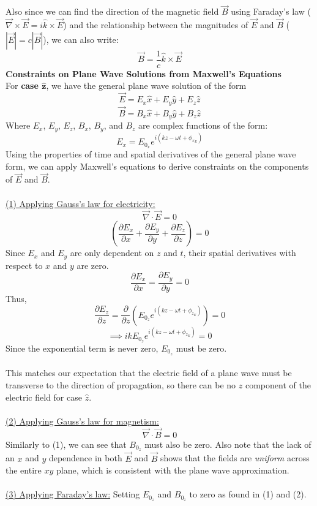 \documentclass[12pt]{article}
\begin{document}
Also since we can find the direction of the magnetic field $\vec{B}$ using Faraday's law ($\vec{\nabla}\times\vec{E} = i\hat{k}\times\vec{E} $) and the relationship between the magnitudes of $\vec{E}$ and $\vec{B}$ ($|\vec{E}| = c|\vec{B}|$), we can also write:
\[\boxed{\vec{B}=\frac{1}{c}\hat{k}\times\vec{E}}\]
\newpage\noindent
\textbf{Constraints on Plane Wave Solutions from Maxwell's Equations}\\
For \textbf{case $\mathbf{\hat{z}}$}, we have the general plane wave solution of the form
\[\vec{E} = E_x \hat{x} + E_y \hat{y} + E_z \hat{z}\]
\[\vec{B} = B_x \hat{x} + B_y \hat{y} + B_z \hat{z}\]
Where $E_x$, $E_y$, $E_z$, $B_x$, $B_y$, and $B_z$  are complex functions of the form:
\[E_x = E_{0_x} e^{i (kz - \omega t + \phi_{x_E})}\]
Using the properties of time and spatial derivatives of the general plane wave form, we can apply Maxwell's equations to derive constraints on the components of $\vec{E}$ and $\vec{B}$.\\\\
\underline{(1) Applying Gauss's law for electricity:}
\[\vec{\nabla} \cdot \vec{E} = 0 \]
\[\left(\frac{\partial E_x}{\partial x} + \frac{\partial E_y}{\partial y} + \frac{\partial E_z}{\partial z}\right) = 0\]
Since $E_x$ and $E_y$ are only dependent on $z$ and $t$, their spatial derivatives with respect to $x$ and $y$ are zero. 
\[\frac{\partial E_x}{\partial x} = \frac{\partial E_y}{\partial y} = 0\]
Thus,
\[\frac{\partial E_z}{\partial z} = \frac{\partial}{\partial z} \left( E_{0_z} e^{i (kz - \omega t+\phi_{z_E})} \right) = 0\]
\[\implies ik E_{0_z} e^{i (kz - \omega t+\phi_{z_E})} =0\]
Since the exponential term is never zero, $\boxed{E_{0_z}\text{ must be zero}}$.\\\\
This matches our expectation that the electric field of a plane wave must be transverse to the direction of propagation, so there can be no $z$ component of the electric field for case $\hat{z}$.\\\\
\underline{(2) Applying Gauss's law for magnetism:}
\[\vec{\nabla} \cdot \vec{B} = 0\]
Similarly to (1), we can see that $B_{0_z}$ must also be zero. Also note that the lack of an $x$ and $y$ dependence in both $\vec{E}$ and $\vec{B}$ shows that the fields are \textit{uniform} across the entire $xy$ plane, which is consistent with the plane wave approximation.\\\\
\underline{(3) Applying Faraday's law:} Setting $E_{0_z}$ and $B_{0_z}$ to zero as found in (1) and (2).
\end{document}
